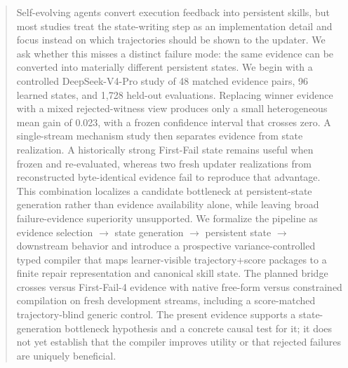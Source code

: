 \begin{abstract}
Self-evolving agents convert execution feedback into persistent skills, but most studies treat the state-writing step as an implementation detail and focus instead on which trajectories should be shown to the updater. We ask whether this misses a distinct failure mode: the same evidence can be converted into materially different persistent states. We begin with a controlled DeepSeek-V4-Pro study of 48 matched evidence pairs, 96 learned states, and 1,728 held-out evaluations. Replacing winner evidence with a mixed rejected-witness view produces only a small heterogeneous mean gain of 0.023, with a frozen confidence interval that crosses zero. A single-stream mechanism study then separates evidence from state realization. A historically strong First-Fail state remains useful when frozen and re-evaluated, whereas two fresh updater realizations from reconstructed byte-identical evidence fail to reproduce that advantage. This combination localizes a candidate bottleneck at persistent-state generation rather than evidence availability alone, while leaving broad failure-evidence superiority unsupported. We formalize the pipeline as evidence selection $\rightarrow$ state generation $\rightarrow$ persistent state $\rightarrow$ downstream behavior and introduce a prospective variance-controlled typed compiler that maps learner-visible trajectory+score packages to a finite repair representation and canonical skill state. The planned bridge crosses \win{} versus First-Fail-4 evidence with native free-form versus constrained compilation on fresh development streams, including a score-matched trajectory-blind generic control. The present evidence supports a state-generation bottleneck hypothesis and a concrete causal test for it; it does not yet establish that the compiler improves utility or that rejected failures are uniquely beneficial.
\end{abstract}
